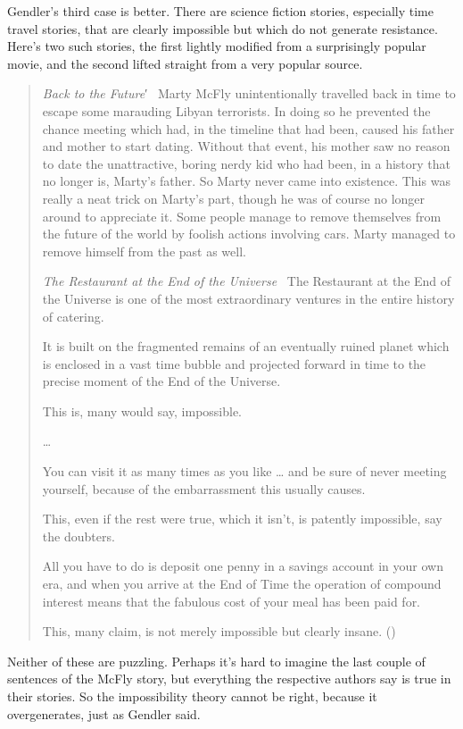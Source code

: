 \documentclass[
  10pt,
  letterpaper,
  DIV=11,
  numbers=noendperiod,
  twoside]{scrartcl}
\begin{document}
Gendler's third case is better. There are science fiction stories,
especially time travel stories, that are clearly impossible but which do
not generate resistance. Here's two such stories, the first lightly
modified from a surprisingly popular movie, and the second lifted
straight from a very popular source.

\begin{quote}
\emph{Back to the Future}′~ Marty McFly unintentionally travelled back
in time to escape some marauding Libyan terrorists. In doing so he
prevented the chance meeting which had, in the timeline that had been,
caused his father and mother to start dating. Without that event, his
mother saw no reason to date the unattractive, boring nerdy kid who had
been, in a history that no longer is, Marty's father. So Marty never
came into existence. This was really a neat trick on Marty's part,
though he was of course no longer around to appreciate it. Some people
manage to remove themselves from the future of the world by foolish
actions involving cars. Marty managed to remove himself from the past as
well.

\emph{The Restaurant at the End of the Universe}~ The Restaurant at the
End of the Universe is one of the most extraordinary ventures in the
entire history of catering.

It is built on the fragmented remains of an eventually ruined planet
which is enclosed in a vast time bubble and projected forward in time to
the precise moment of the End of the Universe.

This is, many would say, impossible.

\ldots{}

You can visit it as many times as you like \ldots{} and be sure of never
meeting yourself, because of the embarrassment this usually causes.

This, even if the rest were true, which it isn't, is patently
impossible, say the doubters.

All you have to do is deposit one penny in a savings account in your own
era, and when you arrive at the End of Time the operation of compound
interest means that the fabulous cost of your meal has been paid for.

This, many claim, is not merely impossible but clearly insane.
()
\end{quote}

Neither of these are puzzling. Perhaps it's hard to imagine the last
couple of sentences of the McFly story, but everything the respective
authors say is true in their stories. So the impossibility theory cannot
be right, because it overgenerates, just as Gendler said.
\end{document}
